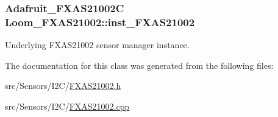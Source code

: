 \subsubsection[{\texorpdfstring{inst\+\_\+\+F\+X\+A\+S21002}{inst_FXAS21002}}]{\setlength{\rightskip}{0pt plus 5cm}Adafruit\+\_\+\+F\+X\+A\+S21002C Loom\+\_\+\+F\+X\+A\+S21002\+::inst\+\_\+\+F\+X\+A\+S21002\hspace{0.3cm}{\ttfamily [protected]}}\hypertarget{class_loom___f_x_a_s21002_a2f7e11c7ae7894a1990beedf7894e9aa}{}\label{class_loom___f_x_a_s21002_a2f7e11c7ae7894a1990beedf7894e9aa}


Underlying F\+X\+A\+S21002 sensor manager instance. 



The documentation for this class was generated from the following files\+:\begin{DoxyCompactItemize}
\item 
src/\+Sensors/\+I2\+C/\hyperlink{_f_x_a_s21002_8h}{F\+X\+A\+S21002.\+h}\item 
src/\+Sensors/\+I2\+C/\hyperlink{_f_x_a_s21002_8cpp}{F\+X\+A\+S21002.\+cpp}\end{DoxyCompactItemize}

